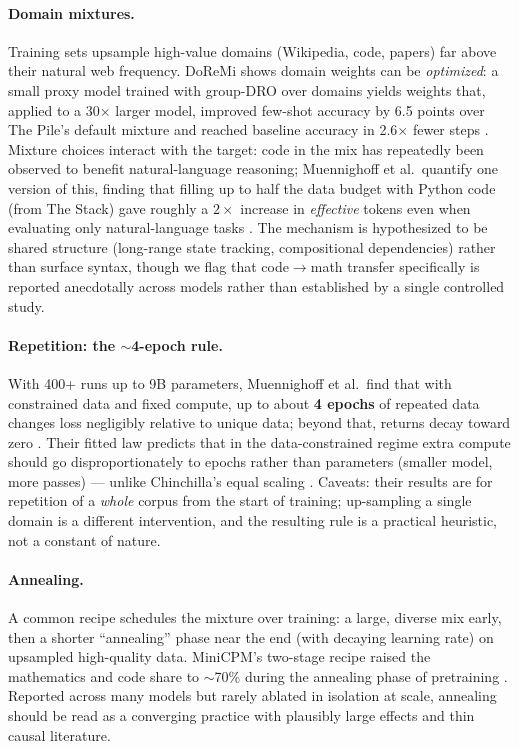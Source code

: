 \documentclass[11pt]{article}
\begin{document}
\paragraph{Domain mixtures.} Training sets upsample high-value domains (Wikipedia, code, papers) far above their natural web frequency. DoReMi shows domain weights can be \emph{optimized}: a small proxy model trained with group-DRO over domains yields weights that, applied to a 30$\times$ larger model, improved few-shot accuracy by 6.5 points over The Pile's default mixture and reached baseline accuracy in 2.6$\times$ fewer steps \cite{xie2023doremi}. Mixture choices interact with the target: code in the mix has repeatedly been observed to benefit natural-language reasoning; Muennighoff et al.\ quantify one version of this, finding that filling up to half the data budget with Python code (from The Stack) gave roughly a $2\times$ increase in \emph{effective} tokens even when evaluating only natural-language tasks \cite{muennighoff2023scaling,kocetkov2022stack}. The mechanism is hypothesized to be shared structure (long-range state tracking, compositional dependencies) rather than surface syntax, though we flag that code$\to$math transfer specifically is reported anecdotally across models rather than established by a single controlled study.

\paragraph{Repetition: the $\sim$4-epoch rule.} With 400+ runs up to 9B parameters, Muennighoff et al.\ find that with constrained data and fixed compute, up to about \textbf{4 epochs} of repeated data changes loss negligibly relative to unique data; beyond that, returns decay toward zero \cite{muennighoff2023scaling}. Their fitted law predicts that in the data-constrained regime extra compute should go disproportionately to epochs rather than parameters (smaller model, more passes) --- unlike Chinchilla's equal scaling \cite{hoffmann2022chinchilla}. Caveats: their results are for repetition of a \emph{whole} corpus from the start of training; up-sampling a single domain is a different intervention, and the resulting rule is a practical heuristic, not a constant of nature.

\paragraph{Annealing.} A common recipe schedules the mixture over training: a large, diverse mix early, then a shorter ``annealing'' phase near the end (with decaying learning rate) on upsampled high-quality data. MiniCPM's two-stage recipe raised the mathematics and code share to $\sim$70\% during the annealing phase of pretraining \cite{hu2024minicpm}. Reported across many models but rarely ablated in isolation at scale, annealing should be read as a converging practice with plausibly large effects and thin causal literature.
\end{document}
